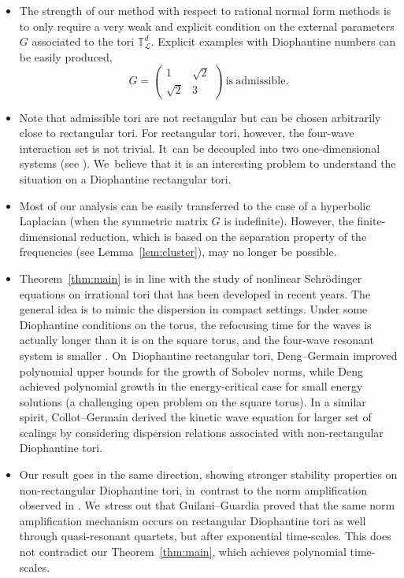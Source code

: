 \documentclass[JEP,XML,SOM,Unicode,published]{cedram}
\theoremstyle{plain}
\theoremstyle{definition}
\newcommand{\1}{\mathbf{1}}
\begin{document}
\begin{itemize}
\item The strength of our method with respect to rational normal form methods is to only require a very weak and explicit condition on the external parameters $G$ associated to the tori $\mathbb{T}^d_{\mathscr{L}}$. Explicit examples with Diophantine numbers can be easily produced, \eg
\begin{equation}
\label{eq:monjoliexemple}
G =
\begin{pmatrix} 1 & \sqrt{2} \\
\sqrt{2} & 3
\end{pmatrix} \ \mathrm{is} \ \mathrm{admissible}.
\end{equation}
\item Note that admissible tori are not rectangular but can be chosen arbitrarily close to rectangular tori. For rectangular tori, however, the four-wave interaction set is not trivial. It~can be decoupled into two one-dimensional systems (see \cite{Staffilani-Wilson-20}). We~believe that it is an interesting problem to understand the situation on a Diophantine rectangular tori.
\item Most of our analysis can be easily transferred to the case of a hyperbolic Laplacian (when the symmetric matrix $G$ is indefinite). However, the finite-dimen\-sional reduction, which is based on the separation property of the frequencies (see Lemma~\ref{lem:cluster}), may no longer be possible.
\item Theorem~\ref{thm:main} is in line with the study of nonlinear Schrödinger equations on irrational tori that has been developed in recent years. The general idea is to mimic the dispersion in compact settings. Under some Diophantine conditions on the torus, the refocusing time for the waves is actually longer \cite{dgg17,dggmr-22} than it is on the square torus, and the four-wave resonant system is smaller \cite{Staffilani-Wilson-20}. On~Diophantine rectangular tori, Deng--Germain \cite{dg19} improved polynomial upper bounds for the growth of Sobolev norms, while Deng \cite{Deng-19} achieved polynomial growth in the energy-critical case for small energy solutions (a challenging open problem on the square torus). In a similar spirit, Collot--Germain \cite{CG20} derived the kinetic wave equation for larger set of scalings by considering dispersion relations associated with non-rectangular Diophantine tori.
\item Our result goes in the same direction, showing stronger stability properties on non-rectangular Diophantine tori, in~contrast to the norm amplification observed in \cite{CKSTT}. We~stress out that Guilani--Guardia \cite{GG22} proved that the same norm amplification mechanism occurs on rectangular Diophantine tori as well through quasi-resonant quartets, but after exponential time-scales. This does not contradict our Theorem~\ref{thm:main}, which achieves polynomial time-scales.
\end{itemize}
\end{document}
